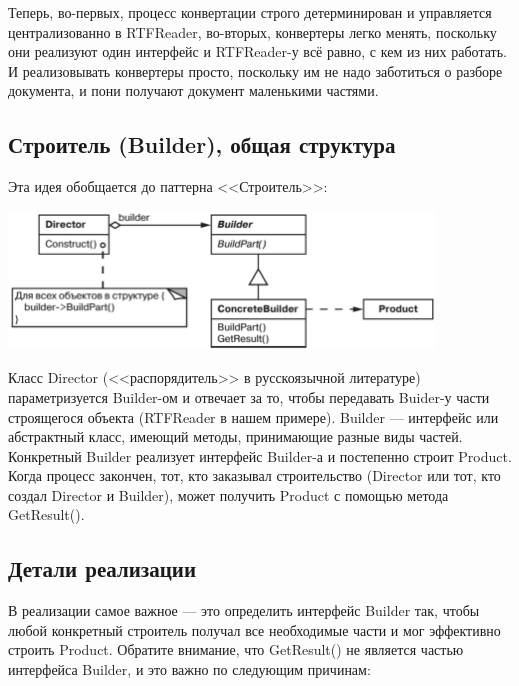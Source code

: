 \documentclass{../../text-style}
\begin{document}
Теперь, во-первых, процесс конвертации строго детерминирован и управляется централизованно в RTFReader, во-вторых, конвертеры легко менять, поскольку они реализуют один интерфейс и RTFReader-у всё равно, с кем из них работать. И реализовывать конвертеры просто, поскольку им не надо заботиться о разборе документа, и пони получают документ маленькими частями.

\subsection{Строитель (Builder), общая структура}

Эта идея обобщается до паттерна <<Строитель>>:

\begin{center}
    \includegraphics[width=0.85\textwidth]{builder.png}
\end{center}

Класс Director (<<распорядитель>> в русскоязычной литературе) параметризуется Builder-ом и отвечает за то, чтобы передавать Buider-у части строящегося объекта (RTFReader в нашем примере). Builder --- интерфейс или абстрактный класс, имеющий методы, принимающие разные виды частей. Конкретный Builder реализует интерфейс Builder-а и постепенно строит Product. Когда процесс закончен, тот, кто заказывал строительство (Director или тот, кто создал Director и Builder), может получить Product с помощью метода GetResult().

\subsection{Детали реализации}

В реализации самое важное --- это определить интерфейс Builder так, чтобы любой конкретный строитель получал все необходимые части и мог эффективно строить Product. Обратите внимание, что GetResult() не является частью интерфейса Builder, и это важно по следующим причинам:
\end{document}

